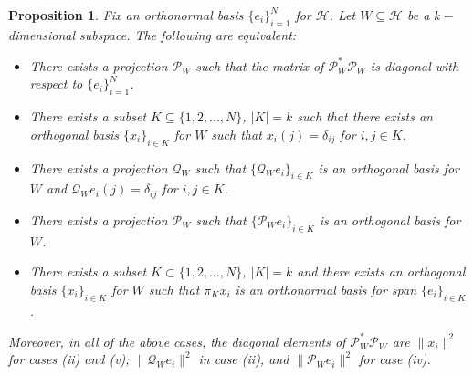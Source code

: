 \documentclass[11pt,reqno]{amsart}
\newtheorem{proposition}[thm]{Proposition}
\theoremstyle{remark}
\begin{document}
\begin{proposition}\label{2}
Fix an orthonormal basis $\{e_i\}_{i=1}^N$ for $\mathcal{H}$.  Let $W\subseteq\mathcal{H}$ be a $k-$dimensional subspace.  The following are equivalent:
\begin{itemize}
\item[(i)] There exists a projection $\mathcal{P}_{W}$ such that the matrix of $\mathcal{P}_W^*\mathcal{P}_W$ is diagonal with respect to $\{e_i\}_{i=1}^N$.
\item[(ii)] There exists a subset $K\subseteq\{1,2,...,N\}$, $|K|=k$ such that there exists an orthogonal basis $\{x_i\}_{i\in K}$ for $W$ such that $x_i(j)=\delta_{ij}$ for $i,j\in K$.
\item[(iii)] There exists a projection  $\mathcal{Q}_W$ such that $\{\mathcal{Q}_We_i\}_{i\in K}$ is an orthogonal basis for $W$ and $\mathcal{Q}_We_i(j)=\delta_{ij}$ for $i,j\in K$.
\item[(iv)] There exists a projection $\mathcal{P}_W$ such that $\{\mathcal{P}_We_i\}_{i\in K}$ is an orthogonal basis for $W$.
\item[(v)] There exists a subset $K\subset \{1,2,\ldots,N\}$, $|K|=k$ and there exists an orthogonal
basis $\{x_i\}_{i\in K}$ for $W$ such that $\pi_Kx_i$ is an orthonormal basis for span $\{e_i\}_{i\in K}$.
\end{itemize}
Moreover, in all of the above cases, the diagonal elements of ${\mathcal P}_W^*{\mathcal P}_W$ are
$\|x_i\|^2$ for cases (ii) and (v);  $\|{\mathcal Q}_We_i\|^2$ in case (ii), and $\|{\mathcal P}_We_i\|^2$ for case (iv).
\end{proposition}
\end{document}
